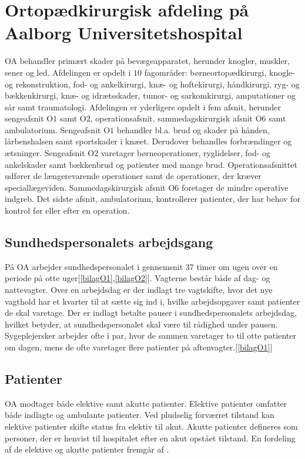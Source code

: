 \section{Ortopædkirurgisk afdeling på Aalborg Universitetshospital}
OA behandler primært skader på bevægeapparatet, herunder knogler, muskler, sener og led. Afdelingen er opdelt i $10$ fagområder: børneortopædkirurgi, knogle- og rekonstruktion, fod- og ankelkirurgi, knæ- og hoftekirurgi, håndkirurgi, ryg- og bækkenkirurgi, knæ- og idrætsskader, tumor- og sarkomkirurgi, amputationer og sår samt traumatologi. Afdelingen er yderligere opdelt i fem afsnit, herunder sengeafsnit O$1$ samt O$2$, operationsafsnit, sammedagskirurgisk afsnit O$6$ samt ambulatorium. 
Sengeafsnit O$1$ behandler bl.a. brud og skader på hånden, lårbenshalsen samt sportskader i knæet. Derudover behandles forbrændinger og ætsninger. Sengeafsnit O$2$ varetager børneoperationer, ryglidelser, fod- og ankelskader samt bækkenbrud og patienter med mange brud. Operationsafsnittet udfører de længerevarende operationer samt de operationer, der kræver speciallægeviden. Sammedagskirurgisk afsnit O$6$ foretager de mindre operative indgreb. Det sidste afsnit, ambulatorium, kontrollerer patienter, der har behov for kontrol før eller efter en operation.\cite{Aalborg2016}

\subsection{Sundhedspersonalets arbejdsgang} \label{arb_per}
På OA arbejder sundhedspersonalet i gennemsnit $37$ timer om ugen over en periode på otte uger\cite{Danske2015}[\ref{bilagO1},\ref{bilagO2}]. Vagterne består både af dag- og nattevagter. Over en arbejdsdag er der indlagt tre vagtskifte, hvor det nye vagthold har et kvarter til at sætte sig ind i, hvilke arbejdsopgaver samt patienter de skal varetage. Der er indlagt betalte pauser i sundhedspersonalets arbejdsdag, hvilket betyder, at sundhedspersonalet skal være til rådighed under pausen. Sygeplejersker arbejder ofte i par, hvor de sammen varetager to til otte patienter om dagen, mens de ofte varetager flere patienter på aftenvagter.[\ref{bilagO1}]

\clearpage
\subsection{Patienter}
OA modtager både elektive samt akutte patienter. Elektive patienter omfatter både indlagte og ambulante patienter. Ved pludselig forværret tilstand kan elektive patienter skifte status fra elektiv til akut. Akutte patienter defineres som personer, der er henvist til hospitalet efter en akut opstået tilstand.\cite{RegionNord2016} En fordeling af de elektive og akutte patienter fremgår af .


